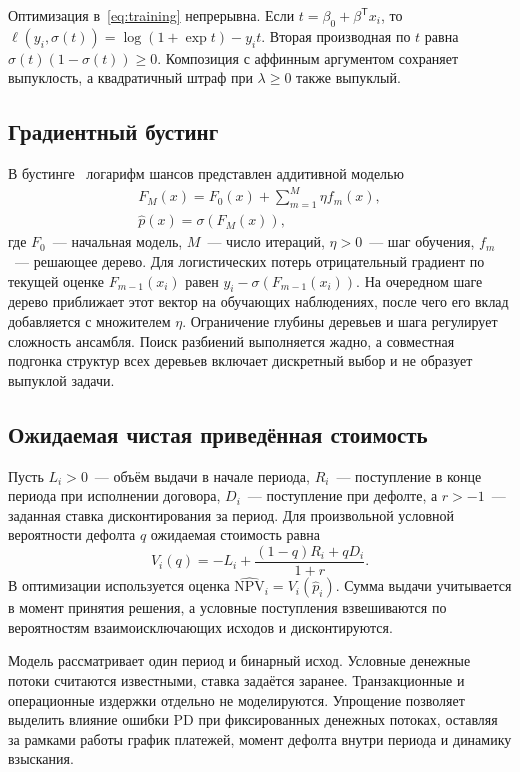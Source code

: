 \documentclass{misisarticle}
\begin{document}
Оптимизация в~\eqref{eq:training} непрерывна. Если $t=\beta_0+\beta^\mathsf{T}x_i$, то $\ell(y_i,\sigma(t))=\log(1+\exp t)-y_i t$. Вторая производная по $t$ равна $\sigma(t)(1-\sigma(t))\geq 0$. Композиция с аффинным аргументом сохраняет выпуклость, а квадратичный штраф при $\lambda\geq0$ также выпуклый.

\subsection{Градиентный бустинг}

В бустинге~\cite{friedman} логарифм шансов представлен аддитивной моделью
\begin{equation}
  \begin{gathered}
    F_M(x)=F_0(x)+\sum_{m=1}^{M}\eta f_m(x),\\
    \hat p(x)=\sigma(F_M(x)),
  \end{gathered}
  \label{eq:boost}
\end{equation}
где $F_0$~--- начальная модель, $M$~--- число итераций, $\eta>0$~--- шаг обучения, $f_m$~--- решающее дерево. Для логистических потерь отрицательный градиент по текущей оценке $F_{m-1}(x_i)$ равен $y_i-\sigma(F_{m-1}(x_i))$. На очередном шаге дерево приближает этот вектор на обучающих наблюдениях, после чего его вклад добавляется с множителем $\eta$. Ограничение глубины деревьев и шага регулирует сложность ансамбля. Поиск разбиений выполняется жадно, а совместная подгонка структур всех деревьев включает дискретный выбор и не образует выпуклой задачи.

\subsection{Ожидаемая чистая приведённая стоимость}

Пусть $L_i>0$~--- объём выдачи в начале периода, $R_i$~--- поступление в конце периода при исполнении договора, $D_i$~--- поступление при дефолте, а $r>-1$~--- заданная ставка дисконтирования за период. Для произвольной условной вероятности дефолта $q$ ожидаемая стоимость равна
\begin{equation}
  V_i(q)=-L_i+\frac{(1-q)R_i+qD_i}{1+r}.
  \label{eq:npv}
\end{equation}
В оптимизации используется оценка $\widehat{\mathrm{NPV}}_i=V_i(\hat p_i)$. Сумма выдачи учитывается в момент принятия решения, а условные поступления взвешиваются по вероятностям взаимоисключающих исходов и дисконтируются.

Модель рассматривает один период и бинарный исход. Условные денежные потоки считаются известными, ставка задаётся заранее. Транзакционные и операционные издержки отдельно не моделируются. Упрощение позволяет выделить влияние ошибки PD при фиксированных денежных потоках, оставляя за рамками работы график платежей, момент дефолта внутри периода и динамику взыскания.
\end{document}
